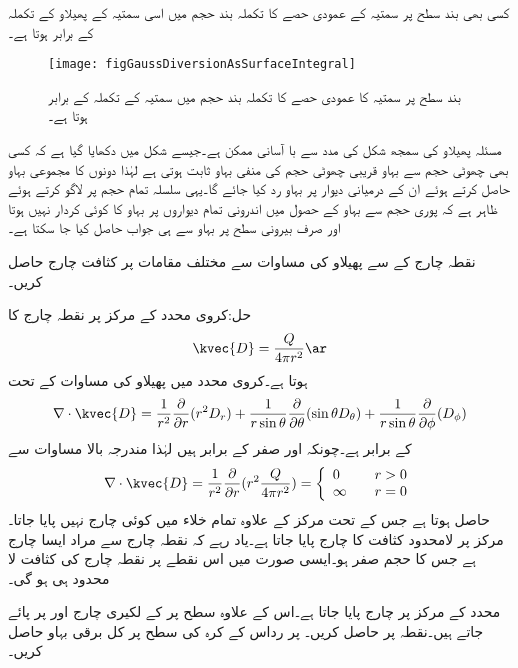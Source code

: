 کسی بھی بند سطح پر  سمتیہ کے عمودی حصے کا تکملہ بند حجم میں اسی سمتیہ کے پھیلاو کے تکملہ کے برابر ہوتا ہے۔

\begin{figure}
\centering
\texttt{[image: figGaussDiversionAsSurfaceIntegral]}
\caption{بند سطح پر سمتیہ کا عمودی حصے کا تکملہ بند حجم میں سمتیہ کے تکملہ کے برابر ہوتا ہے۔}
\label{شکل_گاؤس_پھیلاو_بطور_سطحی_تکلہ}
\end{figure}

مسئلہ پھیلاو کی سمجھ شکل  کی مدد سے با آسانی ممکن ہے۔جیسے شکل میں دکھایا گیا ہے کہ کسی بھی چھوٹی حجم سے بہاو قریبی چھوٹی حجم  کی منفی بہاو ثابت ہوتی ہے لہٰذا دونوں کا مجموعی بہاو  حاصل کرتے ہوئے ان کے درمیانی دیوار  پر بہاو رد کیا جائے گا۔یہی سلسلہ تمام حجم پر لاگو کرتے ہوئے ظاہر ہے کہ پوری حجم سے بہاو کے حصول میں اندرونی تمام دیواروں پر بہاو کا کوئی کردار نہیں ہوتا اور صرف بیرونی سطح پر بہاو سے ہی جواب حاصل کیا جا سکتا ہے۔

نقطہ چارج کے  سے پھیلاو کی مساوات سے مختلف مقامات پر کثافت چارج  حاصل کریں۔

حل:کروی محدد کے مرکز پر نقطہ چارج کا
\begin{align*}
\kvec{D}=\frac{Q}{4\pi r^2} \ar
\end{align*}
ہوتا ہے۔کروی محدد میں پھیلاو کی مساوات کے تحت
\begin{align*}
\nabla \cdot \kvec{D}=\frac{1}{r^2 }\frac{\partial }{\partial r} (r^2   D_{r})+\frac{1}{r \sin \theta }\frac{\partial }{\partial \theta} (\sin \theta  D_{\theta})+\frac{1}{r \sin \theta }\frac{\partial }{\partial \phi} (  D_{\phi}) 
\end{align*}
کے برابر ہے۔چونکہ  اور  صفر کے برابر ہیں لہٰذا مندرجہ بالا مساوات سے
\begin{align*}
\nabla \cdot \kvec{D}=\frac{1}{r^2 }\frac{\partial }{\partial r} (r^2 \frac{Q}{4\pi r^2}  )=\left\{
\begin{array}{l  l}
0 &\quad r> 0\\
\infty & \quad r=0
\end{array}
\right.
\end{align*}
حاصل ہوتا ہے جس کے تحت مرکز کے علاوہ تمام خلاء میں کوئی چارج نہیں پایا جاتا۔مرکز پر لامحدود کثافت کا چارج پایا جاتا ہے۔یاد رہے کہ نقطہ چارج سے مراد ایسا چارج ہے جس کا حجم صفر ہو۔ایسی صورت میں اس نقطے پر نقطہ چارج کی کثافت لا محدود ہی ہو گی۔

\newpage
{}
محدد کے مرکز پر  چارج پایا جاتا ہے۔اس کے علاوہ  سطح پر  کے لکیری چارج  اور  پر پائے جاتے ہیں۔نقطہ  پر  حاصل کریں۔ پر رداس  کے کرہ کی سطح پر کل برقی بہاو  حاصل کریں۔ 

